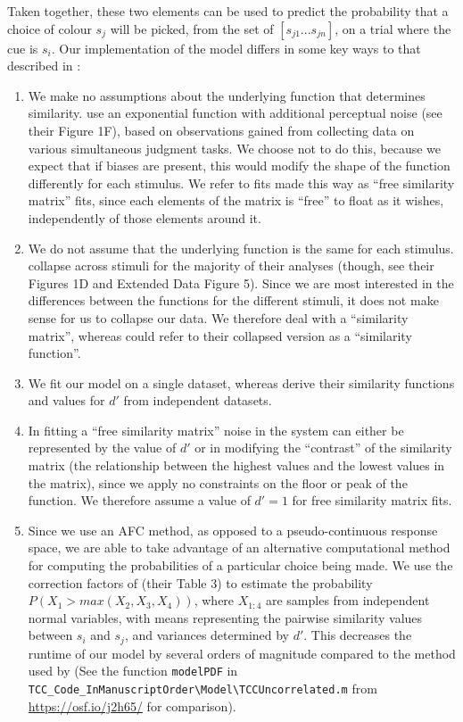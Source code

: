 Taken together, these two elements can be used to predict the probability that a choice of colour $s_j$ will be picked, from the set of $[s_{j1} ... s_{jn}]$, on a trial where the cue is $s_i$.
Our implementation of the model differs in some key ways to that described in \cite{schurgin_psychophysical_2020}:
\begin{enumerate}
\item We make no assumptions about the underlying function that determines similarity. \cite{schurgin_psychophysical_2020} use an exponential function with additional perceptual noise (see their Figure 1F), based on observations gained from collecting data on various simultaneous judgment tasks. We choose not to do this, because we expect that if biases are present, this would modify the shape of the function differently for each stimulus. We refer to fits made this way as ``free similarity matrix'' fits, since each elements of the matrix is ``free'' to float as it wishes, independently of those elements around it.
\item We do not assume that the underlying function is the same for each stimulus. 
\cite{schurgin_psychophysical_2020} collapse across stimuli for the majority of their analyses (though, see their Figures 1D and Extended Data Figure 5). 
Since we are most interested in the differences between the functions for the different stimuli, it does not make sense for us to collapse our data. 
We therefore deal with a ``similarity matrix'', whereas \cite{schurgin_psychophysical_2020} could refer to their collapsed version as a ``similarity function''.
\item We fit our model on a single dataset, whereas \cite{schurgin_psychophysical_2020} derive their similarity functions and values for $d'$ from independent datasets. %
\item In fitting a ``free similarity matrix'' noise in the system can either be represented by the value of $d'$ or in modifying the ``contrast'' of the similarity matrix (the relationship between the highest values and the lowest values in the matrix), since we apply no constraints on the floor or peak of the function. 
We therefore assume a value of $d' = 1$ for free similarity matrix fits. %
\item Since we use an AFC method, as opposed to a pseudo-continuous response space, we are able to take advantage of an alternative computational method for computing the probabilities of a particular choice being made.
We use the correction factors of \cite{mcgraw_common_1992} (their Table 3) to estimate the probability $P(X_1>max(X_2,X_3,X_4))$, where $X_{1:4}$ are samples from independent normal variables, with means representing the pairwise similarity values between $s_i$ and $s_j$, and variances determined by $d'$.
This decreases the runtime of our model by several orders of magnitude compared to the method used by \cite{schurgin_psychophysical_2020} (See the function \lstinline{modelPDF} in \lstinline{TCC_Code_InManuscriptOrder\Model\TCCUncorrelated.m} from \url{https://osf.io/j2h65/} for comparison).
\end{enumerate}

